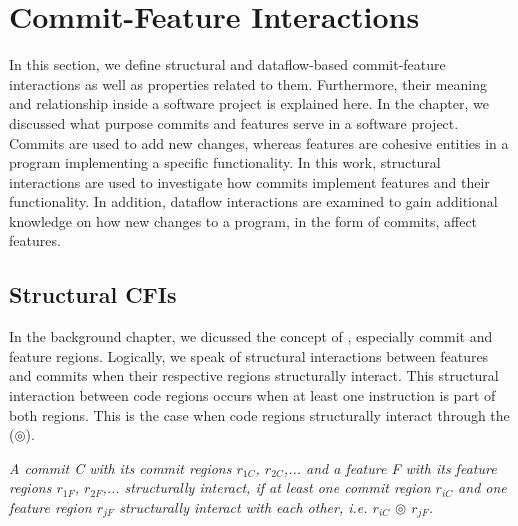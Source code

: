 \chapter{Commit-Feature Interactions}\label{ch:example_chapter}

In this section, we define structural and dataflow-based commit-feature interactions as well as properties related to them.
Furthermore, their meaning and relationship inside a software project is explained here. 
In the  chapter, we discussed what purpose commits and features serve in a software project.
Commits are used to add new changes, whereas features are cohesive entities in a program implementing a specific functionality.
In this work, structural interactions are used to investigate how commits implement features and their functionality.
In addition, dataflow interactions are examined to gain additional knowledge on how new changes to a program, in the form of commits, affect features. 

\section{Structural CFIs}\label{sec:structural_cfis}

In the background chapter, we dicussed the concept of , especially commit and feature regions. 
Logically, we speak of structural interactions between features and commits when their respective regions structurally interact. 
This structural interaction between code regions occurs when at least one instruction is part of both regions.
This is the case when code regions structurally interact through the  ($\circledcirc$).

\begin{definition}\label{def:structural_cfi}
\emph{A commit C with its commit regions $r_{1C}$, $r_{2C}$,... and a feature F with its feature regions $r_{1F}$, $r_{2F}$,... structurally interact, if at least one commit region $r_{iC}$ and one feature region $r_{jF}$ structurally interact with each other, i.e. $r_{iC}$ $\circledcirc$ $r_{jF}$.}
\end{definition}

